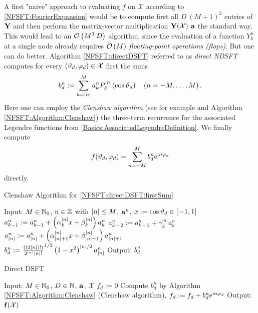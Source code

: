 A first "naive" approach to evaluating $f$ on $\mathcal{X}$ according to \eqref{NFSFT:FourierExpansion} would be to compute first all $D\:(M+1)^2$
entries of $\mathbf{Y}$ and then perform the matrix-vector multiplication $\mathbf{Y}{\hspace{-0.4ex}}\left(\mathcal{X}\right) \: \mathbf{a}$ the standard way. This would lead to an $\mathcal{O}\left(M^3 \: D\right)$
algorithm, since the evaluation of a function $Y_{k}^n$ at a single node already requires $\mathcal{O}\left(M\right)$ \emph{floating-point operations (flops)}.
But one can do better. Algorithm \ref{NFSFT:directDSFT} referred to as \emph{direct NDSFT} computes 
for every $\left(\vartheta_{d},\varphi_{d}\right) \in \mathcal{X}$ first the sums 
\begin{equation}
  \label{NFSFT:directDSFT:firstSum}
  b^{n}_{d} := \sum_{k=\left\vert n\right\vert}^M a_{k}^n P_{k}^{\left\vert n\right\vert}{\hspace{-0.4ex}}\left(\cos\vartheta_{d}\right) \quad \left(n=-M,\ldots,M\right). 
\end{equation}
Here one can employ the \emph{Clenshaw algorithm} (see for example \cite{prtevefl} and Algorithm \ref{NFSFT:Algorithm:Clenshaw}) the three-term recurrence 
for the associated Legendre functions from \eqref{Basics:AssociatedLegendreDefinition}. We finally compute
\begin{equation}
  \label{NFSFT:directNDSFT:secondSum}
  f{\hspace{-0.4ex}}\left(\vartheta_{d},\varphi_{d}\right) = \sum_{n=-M}^M b^{n}_d \mbox{\rm{e}}^{\mbox{\scriptsize\rm{i}} n \varphi_{d}}
\end{equation}
directly.
\begin{algorithm}[htb]
  \caption{Clenshaw Algorithm for \eqref{NFSFT:directDSFT:firstSum}}
  \label{NFSFT:Algorithm:Clenshaw}    
  \begin{algorithmic}
    \STATE  Input: $M \in \mathbb{N}_{0}$, $n \in \mathbb{Z}$ with $\left\vert n\right\vert \le M$, $\mathbf{a}^n$, $x := \cos\vartheta_{d} \in \left[\left.-1,1\right]\right.$
    \STATE
      \STATE $a_{k-1}^n := a_{k-1}^n + \left(\alpha_{k}^{|n|} x + \beta_{k}^{|n|}\right) a_{k}^n$
      \STATE $a_{k-2}^n := a_{k-2}^n + \gamma_{k}^{|n|} a_{k}^n$
    \ENDFOR
    \STATE $a_{\left\vert n\right\vert}^n := a_{\left\vert n\right\vert}^n + \left(\alpha_{\left\vert n\right\vert+1}^{|n|} x + \beta_{\left\vert n\right\vert+1}^{|n|}\right) a_{\left\vert n\right\vert+1}^n$\\[1ex]
    \STATE $b_{d}^n := \frac{((2|n|)!)}{2^{|n|} |n|!}^{1/2} \left(1-x^2\right)^{|n|/2} a_{\left\vert n\right\vert}^n$
    \STATE
    \STATE Output: $b_{d}^n$
\end{algorithmic}
\end{algorithm}
\begin{algorithm}[htb]
  \caption{Direct DSFT}
  \label{NFSFT:directDSFT}    
  \begin{algorithmic}
    \STATE  Input: $M \in \mathbb{N}_{0}$, $D \in \mathbb{N}$, $\mathbf{a}$, $\mathcal{X}$ %
    \STATE
      \STATE $f_{d} := 0$
        \STATE Compute $b^{n}_d$ by Algorithm \ref{NFSFT:Algorithm:Clenshaw} (Clenshaw algorithm),
        \STATE $f_{d} := f_{d} + b^n_d \mbox{\rm{e}}^{\mbox{\scriptsize\rm{i}} n \varphi_{d}}$
      \ENDFOR
    \ENDFOR
    \STATE
    \STATE Output: $\mathbf{f}{\hspace{-0.4ex}}\left(\mathcal{X}\right)$
\end{algorithmic}
\end{algorithm}
